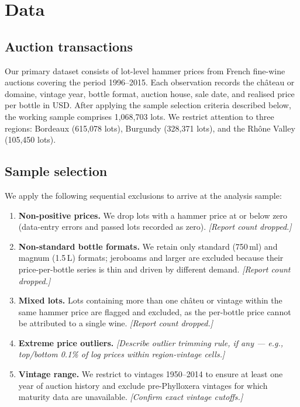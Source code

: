 
\section{Data}
\label{sec:data}

\subsection{Auction transactions}

Our primary dataset consists of lot-level hammer prices from French fine-wine auctions covering
the period 1996--2015. Each observation records the château or domaine, vintage year, bottle
format, auction house, sale date, and realised price per bottle in USD. After applying the
sample selection criteria described below, the working sample comprises 1,068,703 lots.
We restrict attention to three regions: Bordeaux (615,078 lots), Burgundy (328,371 lots), and
the Rhône Valley (105,450 lots).

\subsection{Sample selection}
\label{sec:data:selection}

We apply the following sequential exclusions to arrive at the analysis sample:

\begin{enumerate}
  \item \textbf{Non-positive prices.} We drop lots with a hammer price at or below zero
        (data-entry errors and passed lots recorded as zero). \textit{[Report count dropped.]}
  \item \textbf{Non-standard bottle formats.} We retain only standard (750\,ml) and
        magnum (1.5\,L) formats; jeroboams and larger are excluded because their price-per-bottle
        series is thin and driven by different demand. \textit{[Report count dropped.]}
  \item \textbf{Mixed lots.} Lots containing more than one châteu or vintage within the same
        hammer price are flagged and excluded, as the per-bottle price cannot be attributed to a
        single wine. \textit{[Report count dropped.]}
  \item \textbf{Extreme price outliers.} \textit{[Describe outlier trimming rule, if any —
        e.g., top/bottom 0.1\% of log prices within region-vintage cells.]}
  \item \textbf{Vintage range.} We restrict to vintages 1950--2014 to ensure at least one
        year of auction history and exclude pre-Phylloxera vintages for which maturity data
        are unavailable. \textit{[Confirm exact vintage cutoffs.]}
\end{enumerate}

